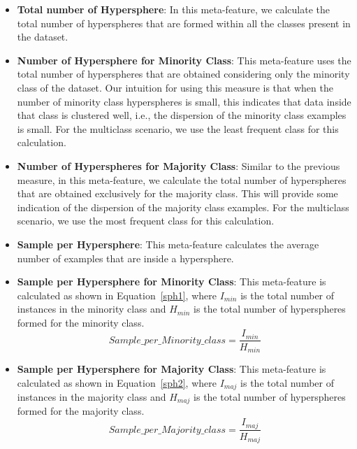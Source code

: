 \documentclass{article}
\begin{document}
\begin{itemize}
    \item \textbf{Total number of Hypersphere}: In this meta-feature, we calculate the total number of hyperspheres that are formed within all the classes present in the dataset.
    
    \item \textbf{Number of Hypersphere for Minority Class}:
    This meta-feature uses the total number of hyperspheres that are obtained considering only the minority class of the dataset. Our intuition for using this measure is that when the number of minority class hyperspheres is small, this indicates that data inside that class is clustered well, i.e., the dispersion of the minority class examples is small. For the multiclass scenario, we use the least frequent class for this calculation.
    
    \item \textbf{Number of Hyperspheres for Majority Class}:
    Similar to the previous measure, in this meta-feature, we calculate the total number of hyperspheres that are obtained exclusively for the majority class. This will provide some indication of the dispersion of the majority class examples. For the multiclass scenario, we use the most frequent class for this calculation.
    
    \item \textbf{Sample per Hypersphere}: This meta-feature calculates the average number of examples that are inside a hypersphere.
    
    \item \textbf{Sample per Hypersphere for Minority Class}: This meta-feature is calculated as shown in Equation~\autoref{sph1}, where $I_{min}$ is the total number of instances in the minority class and $H_{min}$ is the total number of hyperspheres formed for the minority class.
    \begin{equation}
        Sample\_per\_Minority\_class = \frac{I_{min}}{H_{min}}
     \label{sph1}
    \end{equation}

     \item \textbf{Sample per Hypersphere for Majority Class}: This meta-feature is calculated as shown in Equation~\autoref{sph2}, where $I_{maj}$ is the total number of instances in the majority class and $H_{maj}$ is the total number of hyperspheres formed for the majority class.
     \begin{equation}
        Sample\_per\_Majority\_class = \frac{I_{maj}}{H_{maj}}
    \label{sph2}
    \end{equation}
    

\end{itemize}
\end{document}
